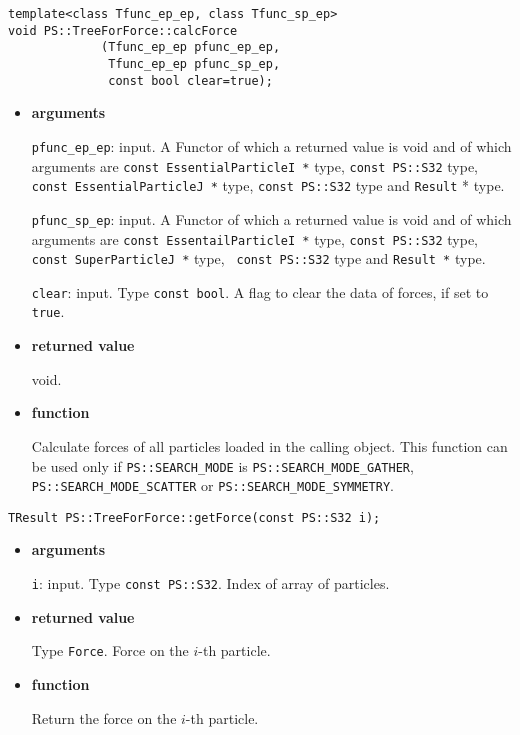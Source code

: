 \begin{screen}
\begin{verbatim}
template<class Tfunc_ep_ep, class Tfunc_sp_ep>
void PS::TreeForForce::calcForce
             (Tfunc_ep_ep pfunc_ep_ep,
              Tfunc_ep_ep pfunc_sp_ep,
              const bool clear=true);
\end{verbatim}
\end{screen}

\begin{itemize}

\item {\bf arguments}

{\tt pfunc\_ep\_ep}: input. A Functor of which a returned value is
void and of which arguments are {\tt const EssentialParticleI *} type, {\tt const PS::S32} type, {\tt const EssentialParticleJ *} type, {\tt const PS::S32} type and {\tt Result} * type.

{\tt pfunc\_sp\_ep}: input. A Functor of which a returned value is
void and of which arguments are {\tt const EssentailParticleI *} type,
{\tt const PS::S32} type, {\tt const SuperParticleJ *} type, {\tt
const PS::S32} type and {\tt Result *} type.

{\tt clear}: input. Type {\tt const bool}. A flag to clear the data of forces, if set to {\tt true}.

\item {\bf returned value}

void.

\item {\bf function}

Calculate forces of all particles loaded in the calling object.  This function can be used only if {\tt PS::SEARCH\_MODE} is {\tt PS::SEARCH\_MODE\_GATHER}, {\tt PS::SEARCH\_MODE\_SCATTER} or {\tt PS::SEARCH\_MODE\_SYMMETRY}.

\end{itemize}


\begin{screen}
\begin{verbatim}
TResult PS::TreeForForce::getForce(const PS::S32 i);
\end{verbatim}
\end{screen}

\begin{itemize}

\item {\bf arguments}

{\tt i}: input. Type {\tt const PS::S32}. Index of array of particles.

\item {\bf returned value}

Type {\tt Force}. Force on the $i$-th particle.

\item {\bf function}

Return the force on the $i$-th particle.

\end{itemize}


